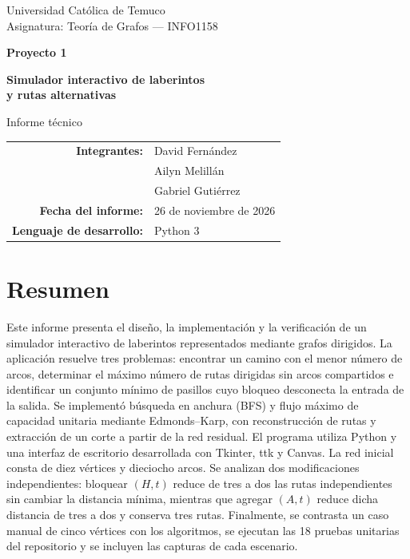 \documentclass[11pt,a4paper]{article}
\begin{document}
\begin{titlepage}
\centering
\vspace*{1.3cm}
{\large Universidad Católica de Temuco\\[0.35cm] Asignatura: Teoría de Grafos --- INFO1158\par}
\vspace{2.2cm}
{\Huge\bfseries Proyecto 1\par}
\vspace{0.5cm}
{\LARGE\bfseries Simulador interactivo de laberintos\\ y rutas alternativas\par}
\vspace{0.65cm}
{\large Informe técnico\par}
\vfill
\begin{tabular}{rl}
\textbf{Integrantes:} & David Fernández \\
& Ailyn Melillán \\
& Gabriel Gutiérrez \\
\textbf{Fecha del informe:} & 26 de noviembre de 2026 \\
\textbf{Lenguaje de desarrollo:} & Python 3 \\
\end{tabular}
\vspace{2.0cm}
\end{titlepage}
\section*{Resumen}
Este informe presenta el diseño, la implementación y la verificación de un simulador interactivo de laberintos representados mediante grafos dirigidos. La aplicación resuelve tres problemas: encontrar un camino con el menor número de arcos, determinar el máximo número de rutas dirigidas sin arcos compartidos e identificar un conjunto mínimo de pasillos cuyo bloqueo desconecta la entrada de la salida. Se implementó búsqueda en anchura (BFS) y flujo máximo de capacidad unitaria mediante Edmonds--Karp, con reconstrucción de rutas y extracción de un corte a partir de la red residual. El programa utiliza Python y una interfaz de escritorio desarrollada con Tkinter, ttk y Canvas. La red inicial consta de diez vértices y dieciocho arcos. Se analizan dos modificaciones independientes: bloquear $(H,t)$ reduce de tres a dos las rutas independientes sin cambiar la distancia mínima, mientras que agregar $(A,t)$ reduce dicha distancia de tres a dos y conserva tres rutas. Finalmente, se contrasta un caso manual de cinco vértices con los algoritmos, se ejecutan las 18 pruebas unitarias del repositorio y se incluyen las capturas de cada escenario.
\end{document}
